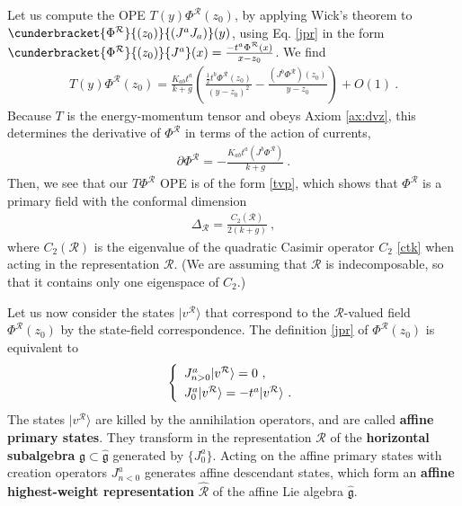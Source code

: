 \documentclass[12pt, a4paper, notitlepage, twoside]{report}
\numberwithin{equation}{section}
\theoremstyle{break}
\begin{document}
Let us
compute the OPE $T(y)\Phi^{\mathcal{R}}(z_0)$, by applying Wick's theorem to $\cunderbracket{\Phi^\mathcal{R}}{(z_0)}{(J^aJ_a)}(y)$, using Eq. \eqref{jpr} in the form $\cunderbracket{\Phi^\mathcal{R}}{(z_0)}{J^a}(x) = \frac{-t^a\Phi^\mathcal{R}(x)}{x-z_0}$.
We find 
\begin{align}
 T(y)\Phi^{\mathcal{R}}(z_0) = \frac{K_{ab}t^a}{k+g}\left(\frac{\frac12 t^b\Phi^{\mathcal{R}}(z_0)}{(y-z_0)^2} -\frac{(J^b\Phi^{\mathcal{R}})(z_0)}{y-z_0}\right) + O(1)\ . 
\end{align}
Because $T$ is the energy-momentum tensor and obeys Axiom \ref{ax:dvz}, this determines the derivative of $\Phi^\mathcal{R}$ in terms of the action of currents,
\begin{align}
\partial\Phi^\mathcal{R} = -\frac{K_{ab}t^a(J^b\Phi^\mathcal{R})}{k+g} \ .
\label{lmp}
\end{align}
Then, we see that our $T\Phi^{\mathcal{R}}$ OPE is 
of the form \eqref{tvp}, which shows that $\Phi^{\mathcal{R}}$ is a primary field with the conformal dimension
\begin{align}
 \boxed{\Delta_\mathcal{R}  = \frac{C_2(\mathcal{R})}{2(k+g)}}\ ,
\label{dr}
\end{align}
where $C_2(\mathcal{R})$ is the eigenvalue of the quadratic Casimir operator $C_2$ \eqref{ctk} when acting in the representation $\mathcal{R}$. (We are assuming that $\mathcal{R}$ is indecomposable, so that it contains only one eigenspace of $C_2$.) 

Let us now consider the states $|v^\mathcal{R}\rangle$ that correspond to the $\mathcal{R}$-valued field $\Phi^\mathcal{R}(z_0)$ by the state-field correspondence.
The definition \eqref{jpr} of $\Phi^\mathcal{R}(z_0)$ is equivalent to 
\begin{align}
\renewcommand{\arraystretch}{1.3}
 \left\{\begin{array}{l}  J^a_{n>0}|v^\mathcal{R}\rangle = 0 \ ,  \\ J^a_0|v^\mathcal{R}\rangle = -t^a |v^\mathcal{R}\rangle\ . \end{array}\right. 
\end{align}
The states $|v^\mathcal{R}\rangle$ are killed by the annihilation operators, and are called \textbf{\boldmath affine primary states}.
They transform in the representation $\mathcal{R}$ of the \textbf{\boldmath horizontal subalgebra} $\mathfrak{g}\subset \hat{\mathfrak{g}}$ generated by $\{J^a_0\}$.
Acting on the affine primary states with creation operators $J^a_{n<0}$ generates affine descendant states, which form an \textbf{\boldmath affine highest-weight representation} $\hat{\mathcal{R}}$ of the affine Lie algebra $\hat{\mathfrak{g}}$.
\end{document}
